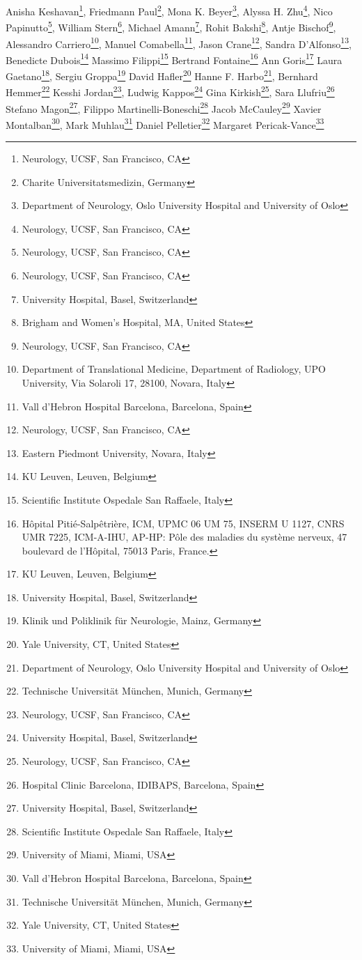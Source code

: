 \iflatexml
Anisha Keshavan\footnote[1]{Neurology, UCSF, San Francisco, CA},
Friedmann Paul\footnote[2]{Charite Universitatsmedizin, Germany},
Mona K. Beyer\footnote[3]{Department of Neurology, Oslo University Hospital and University of Oslo},
Alyssa H. Zhu\footnote[1]{Neurology, UCSF, San Francisco, CA},
Nico Papinutto\footnote[1]{Neurology, UCSF, San Francisco, CA},
William Stern\footnote[1]{Neurology, UCSF, San Francisco, CA},
Michael Amann\footnote[13]{University Hospital, Basel, Switzerland},
Rohit Bakshi\footnote[4]{Brigham and Women's Hospital, MA, United States},
Antje Bischof\footnote[1]{Neurology, UCSF, San Francisco, CA},
Alessandro Carriero\footnote[1]{Department of Translational Medicine, Department of Radiology,  UPO University, Via Solaroli 17, 28100, Novara, Italy},
Manuel Comabella\footnote[5]{Vall d’Hebron Hospital Barcelona, Barcelona, Spain},
Jason Crane\footnote[1]{Neurology, UCSF, San Francisco, CA},
Sandra D’Alfonso\footnote[6]{Eastern Piedmont University, Novara, Italy},
Benedicte Dubois\footnote[7]{KU Leuven, Leuven, Belgium}
Massimo Filippi\footnote[8]{Scientific Institute Ospedale San Raffaele, Italy}
Bertrand Fontaine\footnote[9]{Hôpital Pitié-Salpêtrière, ICM, UPMC 06 UM 75, INSERM U 1127, CNRS UMR 7225, ICM-A-IHU, AP-HP:  
Pôle des maladies du système nerveux, 47 boulevard de l'Hôpital, 75013  
Paris, France.}
Ann Goris\footnote[7]{KU Leuven, Leuven, Belgium}
Laura Gaetano\footnote[13]{University Hospital, Basel, Switzerland},
Sergiu Groppa\footnote[10]{Klinik und Poliklinik für Neurologie, Mainz, Germany}
David Hafler\footnote[11]{Yale University, CT, United States}
Hanne F. Harbo\footnote[3]{Department of Neurology, Oslo University Hospital and University of Oslo},
Bernhard Hemmer\footnote[12]{Technische Universität München, Munich, Germany}
Kesshi Jordan\footnote[1]{Neurology, UCSF, San Francisco, CA},
Ludwig Kappos\footnote[13]{University Hospital, Basel, Switzerland}
Gina Kirkish\footnote[1]{Neurology, UCSF, San Francisco, CA},
Sara Llufriu\footnote[14]{Hospital Clinic Barcelona, IDIBAPS, Barcelona, Spain}
Stefano Magon\footnote[13]{University Hospital, Basel, Switzerland},
Filippo Martinelli-Boneschi\footnote[8]{Scientific Institute Ospedale San Raffaele, Italy}
Jacob McCauley\footnote[15]{University of Miami, Miami, USA}
Xavier Montalban\footnote[5]{Vall d’Hebron Hospital Barcelona, Barcelona, Spain},
Mark Muhlau\footnote[12]{Technische Universität München, Munich, Germany}
Daniel Pelletier\footnote[11]{Yale University, CT, United States}
Margaret Pericak-Vance\footnote[15]{University of Miami, Miami, USA}
